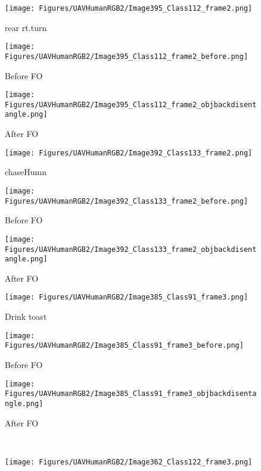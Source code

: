 \documentclass[runningheads]{llncs}
\begin{document}
\begin{figure*}[t]
    \centering
    \captionsetup[subfigure]{labelformat=empty, font=tiny}
\begin{subfigure}[b]{0.1\textwidth}
    \texttt{[image: Figures/UAVHumanRGB2/Image395\_Class112\_frame2.png]}
    \caption{rear rt.turn}
    \end{subfigure}
    \begin{subfigure}[b]{0.1\textwidth}
    \texttt{[image: Figures/UAVHumanRGB2/Image395\_Class112\_frame2\_before.png]}
    \caption{Before FO}
    \end{subfigure}
    \begin{subfigure}[b]{0.1\textwidth}
    \texttt{[image: Figures/UAVHumanRGB2/Image395\_Class112\_frame2\_objbackdisentangle.png]}
    \caption{After FO}
    \end{subfigure}
    \begin{subfigure}[b]{0.1\textwidth}
    \texttt{[image: Figures/UAVHumanRGB2/Image392\_Class133\_frame2.png]}
    \caption{chaseHumn}
    \end{subfigure}
    \begin{subfigure}[b]{0.1\textwidth}
    \texttt{[image: Figures/UAVHumanRGB2/Image392\_Class133\_frame2\_before.png]}
    \caption{Before FO}
    \end{subfigure}
    \begin{subfigure}[b]{0.1\textwidth}
    \texttt{[image: Figures/UAVHumanRGB2/Image392\_Class133\_frame2\_objbackdisentangle.png]}
    \caption{After FO}
    \end{subfigure}
    \begin{subfigure}[b]{0.1\textwidth}
    \texttt{[image: Figures/UAVHumanRGB2/Image385\_Class91\_frame3.png]}
    \caption{Drink toast}
    \end{subfigure}
    \begin{subfigure}[b]{0.1\textwidth}
    \texttt{[image: Figures/UAVHumanRGB2/Image385\_Class91\_frame3\_before.png]}
    \caption{Before FO}
    \end{subfigure}
    \begin{subfigure}[b]{0.1\textwidth}
    \texttt{[image: Figures/UAVHumanRGB2/Image385\_Class91\_frame3\_objbackdisentangle.png]}
    \caption{After FO}
    \end{subfigure}
    \\
    \begin{subfigure}[b]{0.1\textwidth}
    \texttt{[image: Figures/UAVHumanRGB2/Image362\_Class122\_frame3.png]}

\end{subfigure}
\end{figure*}
\end{document}
